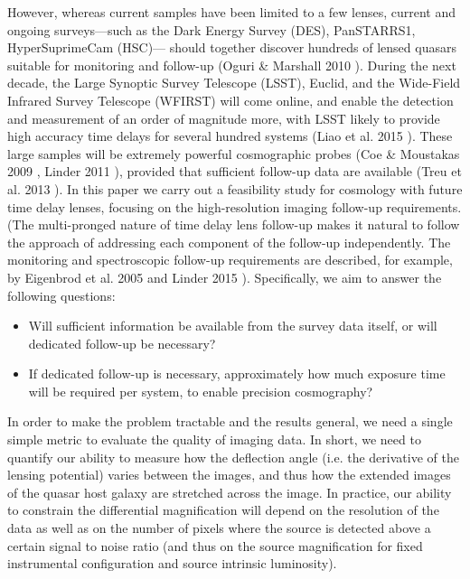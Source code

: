 \documentclass[a4paper,11pt]{article}
\begin{document}
However, whereas current samples have been limited to a few lenses,
current and ongoing surveys---such as the Dark Energy Survey (DES),
PanSTARRS1, HyperSuprimeCam (HSC)--- should together discover hundreds
of lensed quasars suitable for monitoring and follow-up (Oguri \&
Marshall 2010 \cite{2010MNRAS.405.2579O}). During the next decade, the
Large Synoptic Survey Telescope (LSST), Euclid, and the Wide-Field
Infrared Survey Telescope (WFIRST) will come online, and enable the
detection and measurement of an order of magnitude more, with LSST
likely to provide  high accuracy time delays for several hundred
systems (Liao et al. 2015 \cite{2015ApJ...800...11L}). These large
samples will be extremely powerful cosmographic probes (Coe \&
Moustakas 2009 \citep{2009ApJ...706...45C}, Linder 2011
\citep{2011PhRvD..84l3529L}), provided that sufficient follow-up data
are available (Treu et al. 2013 \citep{2013arXiv1306.1272T}). In this
paper we carry out a feasibility study for cosmology with future time
delay lenses, focusing on the  high-resolution imaging follow-up
requirements. (The multi-pronged nature of time delay lens follow-up
makes it natural to follow the approach of addressing each component
of the follow-up independently. The monitoring and spectroscopic
follow-up requirements are described, for example, by Eigenbrod et al.
2005 \cite{2005A&A...436...25E} and Linder 2015
\cite{2015PhRvD..91h3511L}). Specifically, we aim to answer the
following questions:
\begin{itemize}
    \item Will sufficient information be available from the survey
            data itself, or will dedicated follow-up be necessary?
    \item If dedicated follow-up is necessary, approximately how much
            exposure time will be required per system, to enable
            precision cosmography?
\end{itemize}

In order to make the problem tractable and the results general, we
need a single simple metric to evaluate the quality of imaging data.
In short, we need to quantify our ability to measure how the
deflection angle (i.e. the derivative of the lensing potential) varies
between the images, and thus how the extended images of the quasar
host galaxy are stretched across the image. In practice, our ability
to constrain the differential magnification will depend on the
resolution of the data as well as on the number of pixels where the
source is detected above a certain signal to noise ratio (and thus on
the source magnification for fixed instrumental configuration and
source intrinsic luminosity).
\end{document}
